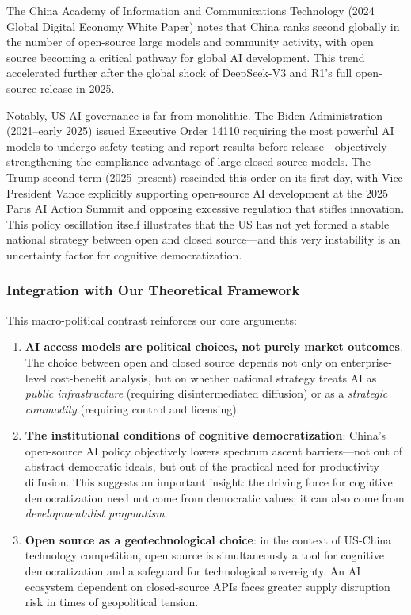 ﻿\documentclass[12pt,a4paper]{article}
\begin{document}
The China Academy of Information and Communications Technology (2024 Global Digital Economy White Paper) notes that China ranks second globally in the number of open-source large models and community activity, with open source becoming a critical pathway for global AI development. This trend accelerated further after the global shock of DeepSeek-V3 and R1's full open-source release in 2025.

Notably, US AI governance is far from monolithic. The Biden Administration (2021--early 2025) issued Executive Order 14110 requiring the most powerful AI models to undergo safety testing and report results before release---objectively strengthening the compliance advantage of large closed-source models. The Trump second term (2025--present) rescinded this order on its first day, with Vice President Vance explicitly supporting open-source AI development at the 2025 Paris AI Action Summit and opposing excessive regulation that stifles innovation. This policy oscillation itself illustrates that the US has not yet formed a stable national strategy between open and closed source---and this very instability is an uncertainty factor for cognitive democratization.

\subsubsection{Integration with Our Theoretical Framework}

This macro-political contrast reinforces our core arguments:

\begin{enumerate}
\item \textbf{AI access models are political choices, not purely market outcomes}. The choice between open and closed source depends not only on enterprise-level cost-benefit analysis, but on whether national strategy treats AI as \textit{public infrastructure} (requiring disintermediated diffusion) or as a \textit{strategic commodity} (requiring control and licensing).
\item \textbf{The institutional conditions of cognitive democratization}: China's open-source AI policy objectively lowers spectrum ascent barriers---not out of abstract democratic ideals, but out of the practical need for productivity diffusion. This suggests an important insight: the driving force for cognitive democratization need not come from democratic values; it can also come from \textit{developmentalist pragmatism}.
\item \textbf{Open source as a geotechnological choice}: in the context of US-China technology competition, open source is simultaneously a tool for cognitive democratization and a safeguard for technological sovereignty. An AI ecosystem dependent on closed-source APIs faces greater supply disruption risk in times of geopolitical tension.
\end{enumerate}
\end{document}
